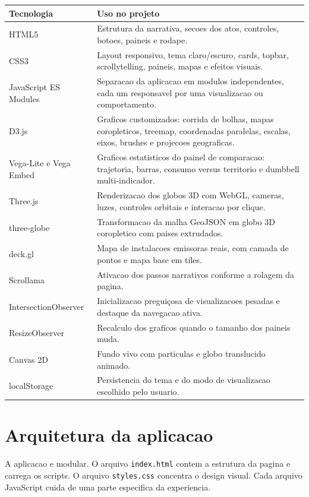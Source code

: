 \documentclass[12pt,a4paper]{article}
\begin{document}
\begin{longtable}{>{\raggedright\arraybackslash}p{4cm}>{\raggedright\arraybackslash}p{10cm}}
\toprule
\textbf{Tecnologia} & \textbf{Uso no projeto} \\
\midrule
HTML5 & Estrutura da narrativa, secoes dos atos, controles, botoes, paineis e rodape. \\
CSS3 & Layout responsivo, tema claro/escuro, cards, topbar, scrollytelling, paineis, mapas e efeitos visuais. \\
JavaScript ES Modules & Separacao da aplicacao em modulos independentes, cada um responsavel por uma visualizacao ou comportamento. \\
D3.js & Graficos customizados: corrida de bolhas, mapas coropleticos, treemap, coordenadas paralelas, escalas, eixos, brushes e projecoes geograficas. \\
Vega-Lite e Vega Embed & Graficos estatisticos do painel de comparacao: trajetoria, barras, consumo versus territorio e dumbbell multi-indicador. \\
Three.js & Renderizacao dos globos 3D com WebGL, cameras, luzes, controles orbitais e interacao por clique. \\
three-globe & Transformacao da malha GeoJSON em globo 3D coropletico com paises extrudados. \\
deck.gl & Mapa de instalacoes emissoras reais, com camada de pontos e mapa base em tiles. \\
Scrollama & Ativacao dos passos narrativos conforme a rolagem da pagina. \\
IntersectionObserver & Inicializacao preguiçosa de visualizacoes pesadas e destaque da navegacao ativa. \\
ResizeObserver & Recalculo dos graficos quando o tamanho dos paineis muda. \\
Canvas 2D & Fundo vivo com particulas e globo translucido animado. \\
localStorage & Persistencia do tema e do modo de visualizacao escolhido pelo usuario. \\
\bottomrule
\end{longtable}

\section{Arquitetura da aplicacao}

A aplicacao e modular. O arquivo \texttt{index.html} contem a estrutura da pagina e carrega os scripts. O arquivo \texttt{styles.css} concentra o design visual. Cada arquivo JavaScript cuida de uma parte especifica da experiencia.
\end{document}
